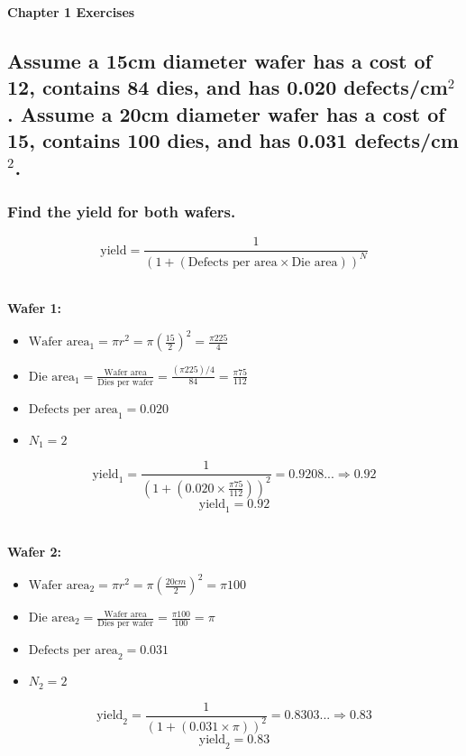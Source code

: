 \documentclass[fleqn]{article}
\begin{document}
\pagestyle{fancy}
\fancyhead{}
\fancyhead[R]{\thepage}
\fancyfoot{}

\begin{center}
    \Large{\textbf{Chapter 1 Exercises}}\\
\end{center}

\setcounter{section}{1}
\setcounter{subsection}{10}

\subsection{Assume a 15cm diameter wafer has a cost of 12, contains 84 dies, and has 0.020 defects/cm$^2$. Assume a 20cm diameter wafer has a cost of 15, contains 100 dies, and has 0.031 defects/cm$^2$.}
\subsubsection{Find the yield for both wafers.}
\[ \text{yield} = \frac{1}{(1 + (\text{Defects per area} \times \text{Die area}))^N} \]

\textbf{\\Wafer 1:}
\begin{itemize}[leftmargin=*]
    \item $\text{Wafer area}_1 = \pi r ^2 = \pi (\frac{15}{2})^2 = \frac{\pi 225}{4}$
    \item $\text{Die area}_1 = \frac{\text{Wafer area}}{\text{Dies per wafer}} = \frac{(\pi225)/4}{84} = \frac{\pi75}{112}$
    \item $\text{Defects per area}_1 = 0.020$
    \item $N_1 = 2$
\end{itemize}
\[ \text{yield}_1 = \frac{1}{(1 + (0.020 \times \frac{\pi75}{112}))^2} = 0.9208... \Rightarrow 0.92\]
\[ \boxed{\text{yield}_1 = 0.92}\]

\textbf{\\Wafer 2:}
\begin{itemize}[leftmargin=*]
    \item $\text{Wafer area}_2 = \pi r ^2 = \pi (\frac{20cm}{2})^2 = \pi100$
    \item $\text{Die area}_2 = \frac{\text{Wafer area}}{\text{Dies per wafer}} = \frac{\pi100}{100} = \pi $
    \item $\text{Defects per area}_2 = 0.031$
    \item $N_2 = 2$
\end{itemize}
\[ \text{yield}_2 = \frac{1}{(1 + (0.031 \times \pi ))^2} = 0.8303... \Rightarrow 0.83 \]
\[ \boxed{\text{yield}_2 = 0.83} \]
\end{document}

